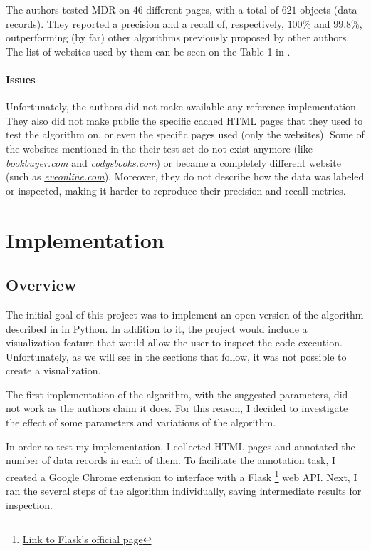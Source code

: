 \documentclass[10pt]{article}
\begin{document}
The authors tested MDR on $46$ different pages, with a total of $621$ objects (data records). They reported a precision and a recall of, respectively, $100\%$ and $99.8\%$, outperforming (by far) other algorithms previously proposed by other authors. The list of websites used by them can be seen on the Table 1 in \cite{mdr}. 


\paragraph{Issues}

Unfortunately, the authors did not make available any reference implementation. They also did not make public the specific cached HTML pages that they used to test the algorithm on, or even the specific pages used (only the websites). Some of the websites mentioned in the their test set do not exist anymore (like \href{http://www.bookbuyer.com}{\textit{bookbuyer.com}} and \href{http://www.codysbooks.com}{\textit{codysbooks.com}}) or became a completely different website (such as \href{https://www.eveonline.com/}{\textit{eveonline.com}}). Moreover, they do not describe how the data was labeled or inspected, making it harder to reproduce their precision and recall metrics.



\section{Implementation}



\subsection{Overview}

The initial goal of this project was to implement an open version of the algorithm described in \cite{mdr} in Python. In addition to it, the project would include a visualization feature that would allow the user to inspect the code execution. Unfortunately, as we will see in the sections that follow, it was not possible to create a visualization. 

The first implementation of the algorithm, with the suggested parameters, did not work as the authors claim it does. For this reason, I decided to investigate the effect of some parameters and variations of the algorithm. 

In order to test my implementation, I collected HTML pages and annotated the number of data records in each of them. To facilitate the annotation task, I created a Google Chrome extension to interface with a Flask \footnote{\href{https://flask.palletsprojects.com/en/1.1.x/}{Link to Flask's official page}} web API. Next, I ran the several steps of the algorithm individually, saving intermediate results for inspection.
\end{document}
